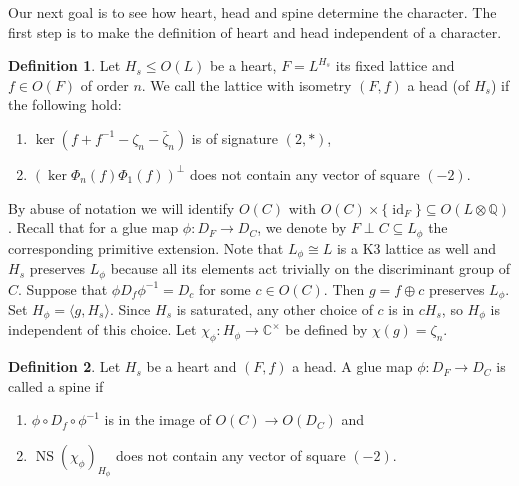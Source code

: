 \documentclass[a4paper]{amsart}
\theoremstyle{definition}
\newtheorem{definition}{Definition}[section]
\theoremstyle{plain}
\DeclareMathOperator{\id}{id}
\DeclareMathOperator{\NS}{NS}
\newcommand{\QQ}{\mathbb{Q}}
\newcommand{\CC}{\mathbb{C}}
\newcommand{\disc}[1]{{D_{#1}}}
\begin{document}
Our next goal is to see how heart, head and spine determine the character.
The first step is to make the definition of heart and head independent of a character.

\begin{definition}\label{heads and hearts}
 Let $H_s \leq O(L)$ be a heart, $F=L^{H_s}$ its fixed lattice and
 $f \in O(F)$ of order $n$. We call the lattice with isometry $(F,f)$ a head (of $H_s$) if the following hold:

 \begin{enumerate}
  \item $\ker(f+f^{-1} - \zeta_n - \bar \zeta_n)$ is of signature $(2,*)$,
  \item $(\ker \Phi_n(f)\Phi_1(f))^\perp$ does not contain any vector of square $(-2)$.
 \end{enumerate}

\end{definition}
By abuse of notation we will identify $O(C)$ with $O(C)\times \{\id_F\} \subseteq O(L\otimes \QQ)$.
Recall that for a glue map $\phi \colon \disc{F} \to \disc{C}$, we denote by $F \perp C \subseteq L_\phi$ the corresponding primitive extension.
Note that $L_\phi\cong L$ is a K3 lattice as well and $H_s$ preserves $L_\phi$ because all its elements act trivially on the discriminant group of $C$.
Suppose that $\phi D_f \phi^{-1} = D_c$ for some $c \in O(C)$.
Then $g = f \oplus c$ preserves $L_\phi$. Set  $H_\phi = \langle g , H_s \rangle$.
Since $H_s$ is saturated, any other choice of $c$ is in $cH_s$, so $H_\phi$ is independent of this choice. Let $\chi_\phi\colon H_\phi \to \CC^\times$ be defined by $\chi(g)=\zeta_n$.

\begin{definition}\label{spines}
Let $H_s$ be a heart and $(F,f)$ a head.
A glue map $\phi \colon \disc{F} \to \disc{C}$ is called a spine if
\begin{enumerate}
 \item  $\phi \circ  D_f \circ \phi^{-1}$ is in the image of $O(C) \to O(\disc{C})$ and
 \item  $\NS(\chi_\phi)_{H_\phi}$ does not contain any vector of square $(-2)$.
\end{enumerate}
\end{definition}
\end{document}

